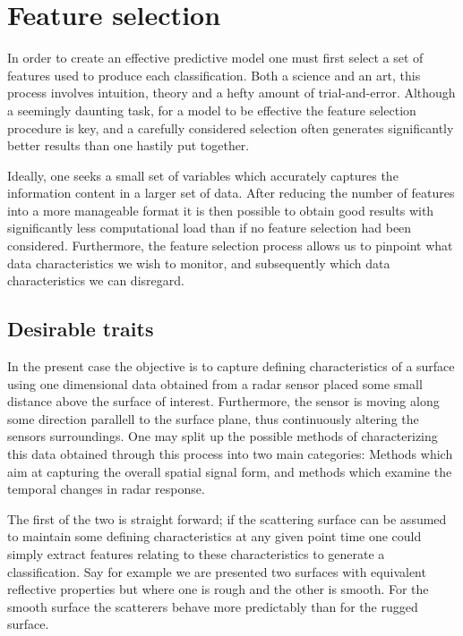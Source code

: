 \chapter{Feature selection}

In order to create an effective predictive model one must first select a set of features used to produce each classification. Both a science and an art, this process involves intuition, theory and a hefty amount of trial-and-error. Although a seemingly daunting task, for a model to be effective the feature selection procedure is key, and a carefully considered selection often generates significantly better results than one hastily put together. 

Ideally, one seeks a small set of variables which accurately captures the information content in a larger set of data. After reducing the number of features into a more manageable format it is then possible to obtain good results with significantly less computational load than if no feature selection had been considered. Furthermore, the feature selection process allows us to pinpoint what data characteristics we wish to monitor, and subsequently which data characteristics we can disregard. 

\section{Desirable traits}

In the present case the objective is to capture defining characteristics of a surface using one dimensional data obtained from a radar sensor placed some small distance above the surface of interest. Furthermore, the sensor is moving along some direction parallell to the surface plane, thus continuously altering the sensors surroundings. One may split up the possible methods of characterizing this data obtained through this process into two main categories: Methods which aim at capturing the overall spatial signal form, and methods which examine the temporal changes in radar response. 

The first of the two is straight forward; if the scattering surface can be assumed to maintain some defining characteristics at any given point time one could simply extract features relating to these characteristics to generate a classification. Say for example we are presented two surfaces with equivalent reflective properties but where one is rough and the other is smooth. For the smooth surface the scatterers behave more predictably than for the rugged surface. 

